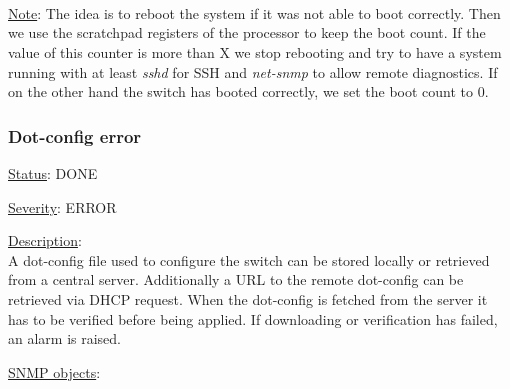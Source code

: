 \begin{pck_descr}
{				\\
				 \\
				\\
				 }
			\item [] \underline{Note}: 
				The idea is to reboot the system if it was not able to boot correctly.
				Then we use the scratchpad registers of the processor to keep
				the boot count. If the value of this counter is more than X we stop
				rebooting and try to have a system running with at least \emph{sshd}
				for SSH and \emph{net-snmp} to allow remote diagnostics. If on the other
				hand the switch has booted correctly, we set the boot count to 0.
		\end{pck_descr}

\subsubsection{\bf Dot-config error}
		\label{fail:other:dot-config}
		\begin{pck_descr}
			\item [] \underline{Status}: DONE
			\item [] \underline{Severity}: ERROR
			\item [] \underline{Description}:\\
				A dot-config file used to configure the switch can be stored locally or
				retrieved from a central server. Additionally a URL to the remote
				dot-config can be retrieved via DHCP request. When the dot-config is
				fetched from the server it has to be verified before being applied. If
				downloading or verification has failed, an alarm is raised.
			\item [] \underline{SNMP objects}:\\
				{\footnotesize
				 \\
				 \\
				 \\
				 \\
				\\
				 }
		\end{pck_descr}


